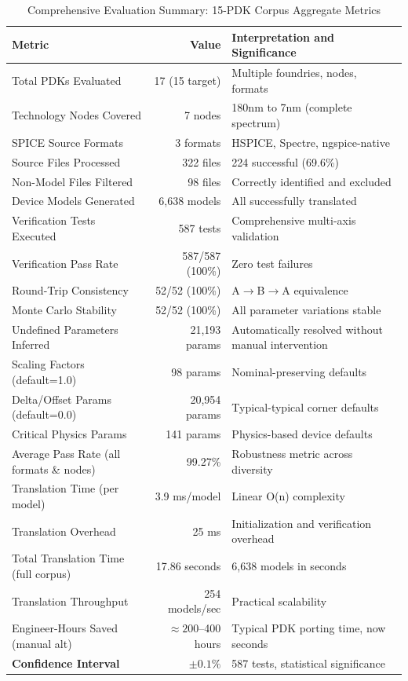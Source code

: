 \documentclass[conference]{IEEEtran}
\begin{document}
\begin{table}[!t]
\caption{Comprehensive Evaluation Summary: 15-PDK Corpus Aggregate Metrics}
\label{tab:summary}
\centering
\renewcommand{\arraystretch}{1.15}
\begin{tabular}{@{}lrl@{}}
\toprule
\textbf{Metric} & \textbf{Value} & \textbf{Interpretation and Significance} \\
\midrule
Total PDKs Evaluated & 17 (15 target) & Multiple foundries, nodes, formats \\
Technology Nodes Covered & 7 nodes & 180nm to 7nm (complete spectrum) \\
SPICE Source Formats & 3 formats & HSPICE, Spectre, ngspice-native \\
Source Files Processed & 322 files & 224 successful (69.6\%) \\
Non-Model Files Filtered & 98 files & Correctly identified and excluded \\
Device Models Generated & 6,638 models & All successfully translated \\
Verification Tests Executed & 587 tests & Comprehensive multi-axis validation \\
Verification Pass Rate & 587/587 (100\%) & Zero test failures \\
Round-Trip Consistency & 52/52 (100\%) & A$\rightarrow$B$\rightarrow$A equivalence \\
Monte Carlo Stability & 52/52 (100\%) & All parameter variations stable \\
Undefined Parameters Inferred & 21,193 params & Automatically resolved without manual intervention \\
\quad Scaling Factors (default=1.0) & 98 params & Nominal-preserving defaults \\
\quad Delta/Offset Params (default=0.0) & 20,954 params & Typical-typical corner defaults \\
\quad Critical Physics Params & 141 params & Physics-based device defaults \\
Average Pass Rate (all formats \& nodes) & 99.27\% & Robustness metric across diversity \\
Translation Time (per model) & 3.9 ms/model & Linear O(n) complexity \\
Translation Overhead & 25 ms & Initialization and verification overhead \\
Total Translation Time (full corpus) & 17.86 seconds & 6,638 models in seconds \\
Translation Throughput & 254 models/sec & Practical scalability \\
Engineer-Hours Saved (manual alt) & $\approx 200$--400 hours & Typical PDK porting time, now seconds \\
\midrule
\textbf{Confidence Interval} & $\pm 0.1\%$ & 587 tests, statistical significance \\
\bottomrule
\end{tabular}
\end{table}
\end{document}
